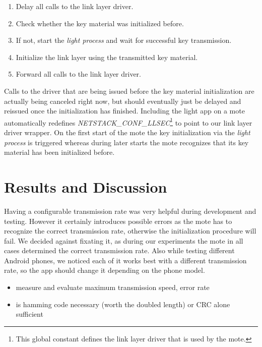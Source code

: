 \documentclass{sig-alternate} %
\begin{document}
\begin{enumerate}
	\item Delay all calls to the link layer driver.
	\item Check whether the key material was initialized before.
	\item If not, start the \textit{light process} and wait for successful key transmission.
	\item Initialize the link layer using the transmitted key material.
	\item Forward all calls to the link layer driver.
\end{enumerate}

Calls to the driver that are being issued before the key material initialization are actually being canceled right now, but should eventually just be delayed and reissued once the initialization has finished.
Including the light app on a mote automatically redefines \textit{NETSTACK\_CONF\_LLSEC}\footnote{This global constant defines the link layer driver that is used by the mote.} to point to our link layer driver wrapper.
On the first start of the mote the key initialization via the \textit{light process} is triggered whereas during later starts the mote recognizes that its key material has been initialized before.

\section{Results and Discussion}
\label{sec:results_and_discussion}

Having a configurable transmission rate was very helpful during development and testing.
However it certainly introduces possible errors as the mote has to recognize the correct transmission rate, otherwise the initialization procedure will fail.
We decided against fixating it, as during our experiments the mote in all cases determined the correct transmission rate.
Also while testing different Android phones, we noticed each of it works best with a different transmission rate, so the app should change it depending on the phone model.

\begin{itemize}
	\item measure and evaluate maximum transmission speed, error rate
	\item is hamming code necessary (worth the doubled length) or CRC alone sufficient
\end{itemize}
\end{document}
